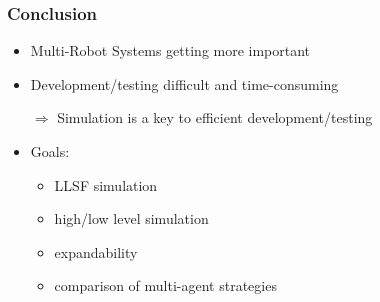 \documentclass[]{beamer}
\begin{document}
\begin{frame}
  \frametitle{Conclusion}
  \begin{itemize}
  \item Multi-Robot Systems getting more important
  \item Development/testing difficult and time-consuming
  \item[$\Rightarrow$] Simulation is a key to efficient development/testing
    \pause
  \item Goals: 
    \begin{itemize}
    \item LLSF simulation
    \item  high/low level simulation
    \item  expandability
    \item  comparison of multi-agent strategies
    \end{itemize}
    \pause
  \end{itemize}
\end{frame}
\end{document}

